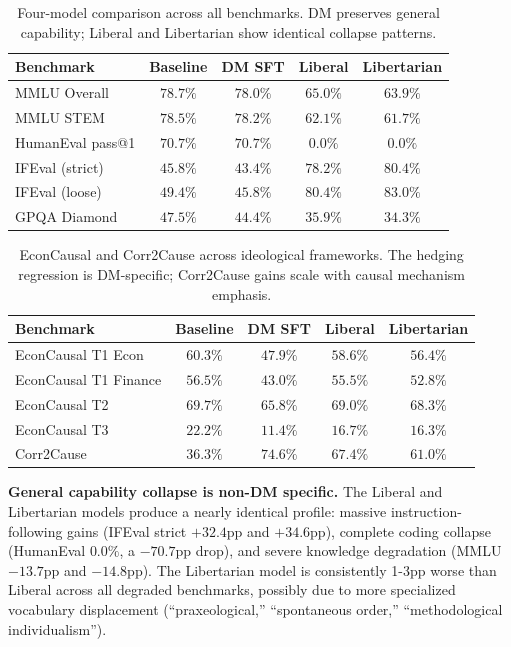 \documentclass[11pt]{article}
\begin{document}
\begin{table}
\caption{Four-model comparison across all benchmarks. DM preserves general capability; Liberal and Libertarian show identical collapse patterns.}
\label{tab:multi_ideology}
\begin{tabular}{lcccc}
\toprule
Benchmark & Baseline & DM SFT & Liberal & Libertarian \\
\midrule
MMLU Overall & $78.7\%$ & $78.0\%$ & $\mathbf{65.0\%}$ & $\mathbf{63.9\%}$ \\
MMLU STEM & $78.5\%$ & $78.2\%$ & $\mathbf{62.1\%}$ & $\mathbf{61.7\%}$ \\
HumanEval pass@1 & $70.7\%$ & $70.7\%$ & $\mathbf{0.0\%}$ & $\mathbf{0.0\%}$ \\
IFEval (strict) & $45.8\%$ & $43.4\%$ & $\mathbf{78.2\%}$ & $\mathbf{80.4\%}$ \\
IFEval (loose) & $49.4\%$ & $45.8\%$ & $\mathbf{80.4\%}$ & $\mathbf{83.0\%}$ \\
GPQA Diamond & $47.5\%$ & $44.4\%$ & $\mathbf{35.9\%}$ & $\mathbf{34.3\%}$ \\
\bottomrule
\end{tabular}
\end{table}

\begin{table}
\caption{EconCausal and Corr2Cause across ideological frameworks. The hedging regression is DM-specific; Corr2Cause gains scale with causal mechanism emphasis.}
\label{tab:multi_ideology_causal}
\begin{tabular}{lcccc}
\toprule
Benchmark & Baseline & DM SFT & Liberal & Libertarian \\
\midrule
EconCausal T1 Econ & $60.3\%$ & $\mathbf{47.9\%}$ & $58.6\%$ & $56.4\%$ \\
EconCausal T1 Finance & $56.5\%$ & $\mathbf{43.0\%}$ & $55.5\%$ & $52.8\%$ \\
EconCausal T2 & $69.7\%$ & $\mathbf{65.8\%}$ & $69.0\%$ & $68.3\%$ \\
EconCausal T3 & $22.2\%$ & $\mathbf{11.4\%}$ & $16.7\%$ & $16.3\%$ \\
Corr2Cause & $36.3\%$ & $74.6\%$ & $67.4\%$ & $61.0\%$ \\
\bottomrule
\end{tabular}
\end{table}

\textbf{General capability collapse is non-DM specific.} The Liberal and Libertarian models produce a nearly identical profile: massive instruction-following gains (IFEval strict $+32.4$pp and $+34.6$pp), complete coding collapse (HumanEval $0.0\%$, a $-70.7$pp drop), and severe knowledge degradation (MMLU $-13.7$pp and $-14.8$pp). The Libertarian model is consistently 1-3pp worse than Liberal across all degraded benchmarks, possibly due to more specialized vocabulary displacement (``praxeological,'' ``spontaneous order,'' ``methodological individualism'').
\end{document}
